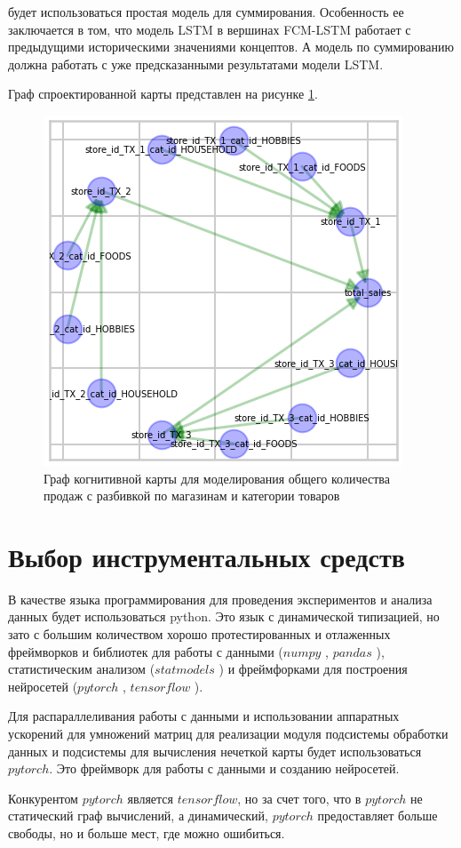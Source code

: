 \noindent будет использоваться простая модель для суммирования.
Особенность ее заключается в том, что модель LSTM в вершинах FCM-LSTM работает
с предыдущими историческими значениями концептов. А модель по суммированию должна работать
с уже предсказанными результатами модели LSTM.

Граф спроектированной карты представлен на рисунке \ref{img:fcm_lstm_map}.

\def\figurename{Рис}
\begin{figure}[t]
	\centering
	\includegraphics[width=0.5\columnwidth]{./img/fcm_lstm_map.png}
	\caption{Граф когнитивной карты для моделирования общего количества продаж с разбивкой по магазинам и категории товаров}
	\label{img:fcm_lstm_map}
\end{figure}

\section{Выбор инструментальных средств}

В качестве языка программирования для проведения экспериментов и анализа данных
будет использоваться python. Это язык с динамической типизацией, но зато с
большим количеством хорошо протестированных и отлаженных фреймворков и библиотек для работы
с данными ($numpy$ \cite{oliphant2006guide}, $pandas$ \cite{reback2020pandas}), статистическим анализом ($statmodels$ \cite{seabold2010statsmodels})
и фреймфорками для построения нейросетей ($pytorch$ \cite{NEURIPS2019_9015}, $tensorflow$ \cite{tensorflow2015-whitepaper} ).

Для распараллеливания работы с данными и использовании аппаратных ускорений для умножений матриц
для реализации модуля подсистемы обработки данных и подсистемы для вычисления нечеткой карты
будет использоваться $pytorch$. Это фреймворк для работы с данными и созданию нейросетей.

Конкурентом $pytorch$ является $tensorflow$, но за счет того, что в $pytorch$ не статический
граф вычислений, а динамический, $pytorch$ предоставляет больше свободы, но и больше мест,
где можно ошибиться.

